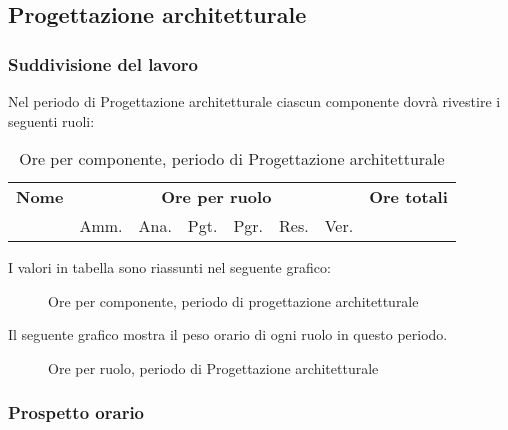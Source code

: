 \pagebreak
\subsection{Progettazione architetturale}

	
	\subsubsection{Suddivisione del lavoro}

	Nel periodo di Progettazione architetturale ciascun componente dovrà rivestire i seguenti ruoli:

	\begin{table}[H]
	\centering
	\begin{tabular}{lccccccc}
	\toprule 
	    \textbf{Nome}  & \multicolumn{6}{c}{\textbf{Ore per ruolo}} & \textbf{Ore totali} \\
	     & Amm. & Ana. & Pgt. & Pgr. & Res. & Ver. \\
	    \midrule
	    
	    \bottomrule
	\end{tabular}
	\caption{Ore per componente, periodo di Progettazione architetturale}
	\end{table}

	I valori in tabella sono riassunti nel seguente grafico: \\

	\begin{figure}[H]
	\caption{Ore per componente, periodo di progettazione architetturale}
	\end{figure}

	Il seguente grafico mostra il peso orario di ogni ruolo in questo periodo.

	\begin{figure}[H]
	\begin{tikzpicture}
		
	\end{tikzpicture}
	\caption{Ore per ruolo, periodo di Progettazione architetturale}
	\end{figure}


	\subsubsection{Prospetto orario}

